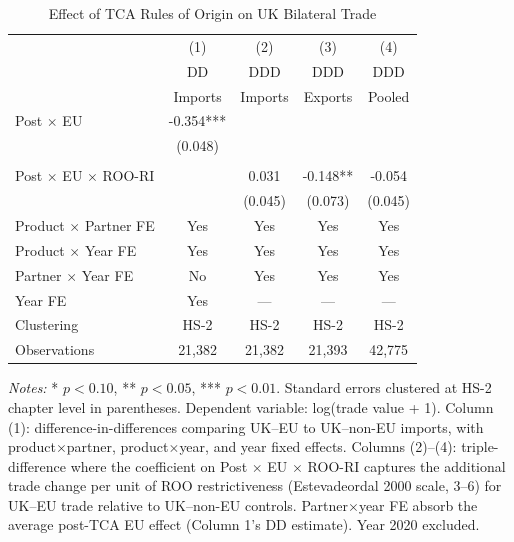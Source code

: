 \begin{table}[H]
\centering
\caption{Effect of TCA Rules of Origin on UK Bilateral Trade}
\label{tab:main}
\begin{threeparttable}
\begin{tabular}{lcccc}
\toprule
 & (1) & (2) & (3) & (4) \\
 & DD & DDD & DDD & DDD \\
 & Imports & Imports & Exports & Pooled \\
\midrule
Post $\times$ EU & -0.354*** & & & \\
 & (0.048) & & & \\
\\
Post $\times$ EU $\times$ ROO-RI & & 0.031 & -0.148** & -0.054 \\
 & & (0.045) & (0.073) & (0.045) \\
\midrule
Product $\times$ Partner FE & Yes & Yes & Yes & Yes \\
Product $\times$ Year FE & Yes & Yes & Yes & Yes \\
Partner $\times$ Year FE & No & Yes & Yes & Yes \\
Year FE & Yes & --- & --- & --- \\
Clustering & HS-2 & HS-2 & HS-2 & HS-2 \\
Observations & 21,382 & 21,382 & 21,393 & 42,775 \\
\bottomrule
\end{tabular}
\begin{tablenotes}[flushleft]
\small
\item \textit{Notes:} * $p<0.10$, ** $p<0.05$, *** $p<0.01$. Standard errors clustered at HS-2 chapter level in parentheses. Dependent variable: log(trade value + 1). Column (1): difference-in-differences comparing UK--EU to UK--non-EU imports, with product$\times$partner, product$\times$year, and year fixed effects. Columns (2)--(4): triple-difference where the coefficient on Post $\times$ EU $\times$ ROO-RI captures the additional trade change per unit of ROO restrictiveness (Estevadeordal 2000 scale, 3--6) for UK--EU trade relative to UK--non-EU controls. Partner$\times$year FE absorb the average post-TCA EU effect (Column 1's DD estimate). Year 2020 excluded.
\end{tablenotes}
\end{threeparttable}
\end{table}
